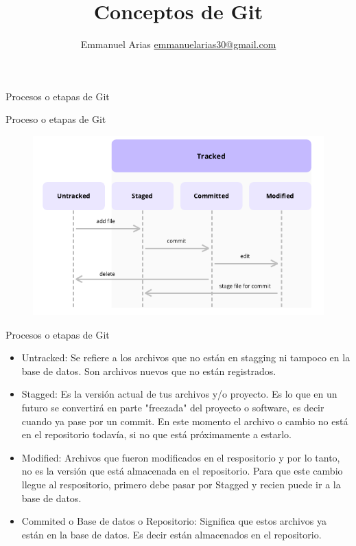 \documentclass{beamer}
\title{Conceptos de Git}
\author{Emmanuel Arias \href{mailto:emmanuelarias30@gmail.com}{emmanuelarias30@gmail.com}}
\date{}
\begin{document}
\begin{frame}[plain]
    \maketitle
\end{frame}

\begin{frame}
	\Huge Procesos o etapas de Git
\end{frame}

\begin{frame}{Proceso o etapas de Git}
	\begin{figure}
		\centering
		\includegraphics[width=1\linewidth]{img/stages}
		\label{fig:stages}
	\end{figure}
\end{frame}

\begin{frame}{Procesos o etapas de Git}
\begin{itemize}
	\item Untracked: Se refiere a los archivos que no están en stagging ni tampoco en la base de datos. Son archivos nuevos que no están registrados.
	\item Stagged: Es la versión actual de tus archivos y/o proyecto. Es lo que en un futuro se convertirá en parte "freezada" del proyecto o software, es decir cuando ya pase por un commit.
	En este momento el archivo o cambio no está en el repositorio todavía, si no que está próximamente a estarlo.
\end{itemize}
\end{frame}

\begin{frame}
	 \begin{itemize}
		\item Modified: Archivos que fueron modificados en el respositorio y por lo tanto, no es la versión que está almacenada en el repositorio. Para que este cambio llegue al respositorio, primero debe pasar por Stagged y recien puede ir a la base de datos.
	 	\item Commited o Base de datos o  Repositorio: Significa que estos archivos ya están en la base de datos. Es decir están almacenados en el repositorio.
	 \end{itemize}
\end{frame}
\end{document}
